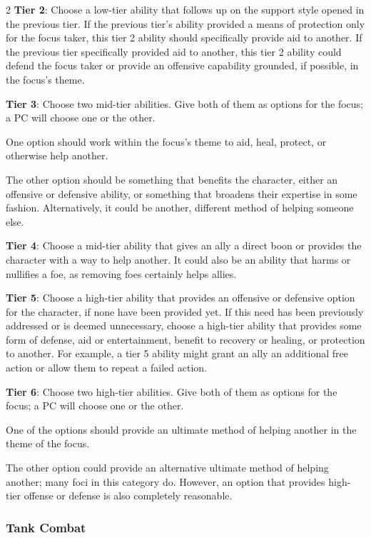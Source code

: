 \begin{multicols}{2}
\textbf{Tier 2}: Choose a low-tier ability that follows up on the support style opened in the previous tier. If the previous tier’s ability provided a means of protection only for the focus taker, this tier 2 ability should specifically provide aid to another. If the previous tier specifically provided aid to another, this tier 2 ability could defend the focus taker or provide an offensive capability grounded, if possible, in the focus’s theme.

\textbf{Tier 3}: Choose two mid-tier abilities. Give both of them as options for the focus; a PC will choose one or the other.

One option should work within the focus’s theme to aid, heal, protect, or otherwise help another.

The other option should be something that benefits the character, either an offensive or defensive ability, or something that broadens their expertise in some fashion. Alternatively, it could be another, different method of helping someone else.

\textbf{Tier 4}: Choose a mid-tier ability that gives an ally a direct boon or provides the character with a way to help another. It could also be an ability that harms or nullifies a foe, as removing foes certainly helps allies.

\textbf{Tier 5}: Choose a high-tier ability that provides an offensive or defensive option for the character, if none have been provided yet. If this need has been previously addressed or is deemed unnecessary, choose a high-tier ability that provides some form of defense, aid or entertainment, benefit to recovery or healing, or protection to another. For example, a tier 5 ability might grant an ally an additional free action or allow them to repeat a failed action.

\textbf{Tier 6}: Choose two high-tier abilities. Give both of them as options for the focus; a PC will choose one or the other.

One of the options should provide an ultimate method of helping another in the theme of the focus. 

The other option could provide an alternative ultimate method of helping another; many foci in this category do. However, an option that provides high-tier offense or defense is also completely reasonable.

\subsubsection{Tank Combat}


\end{multicols}
